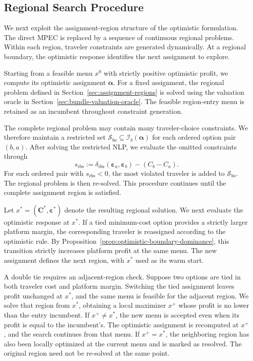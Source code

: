 \documentclass{article}
\begin{document}
\subsection{Regional Search Procedure}
\label{sec:regional-search-procedure}

We next exploit the assignment-region structure of the optimistic
formulation. The direct MPEC is replaced by a sequence of continuous
regional problems. Within each region, traveler constraints are generated
dynamically. At a regional boundary, the optimistic response identifies
the next assignment to explore.

Starting from a feasible menu $x^0$ with strictly positive optimistic
profit, we compute its optimistic assignment $\bm\alpha$. For a fixed
assignment, the regional problem defined in Section~\ref{sec:assignment-regions} is solved using
the valuation oracle in Section~\ref{sec:bundle-valuation-oracle}. The feasible region-entry menu is
retained as an incumbent throughout constraint generation.

The complete regional problem may contain many traveler-choice
constraints. We therefore maintain a restricted set
$\mathcal S_{ba}\subseteq\mathcal I_b(\bm\alpha)$ for each ordered option
pair $(b,a)$. After solving the restricted NLP, we evaluate the omitted
constraints through
\begin{equation}
    s_{iba}
    :=
    \delta_{iba}(\bm\varepsilon_a,\bm\varepsilon_b)
    -
    (C_b-C_a).
    \label{eq:traveler-separation}
\end{equation}
For each ordered pair with $s_{iba}<0$, the most violated traveler is
added to $\mathcal S_{ba}$. The regional problem is then re-solved.
This procedure continues until the complete assignment region is
satisfied.

Let $x^*=(\bm C^*,\bm\varepsilon^*)$ denote the resulting regional
solution. We next evaluate the optimistic response at $x^*$. If a tied
minimum-cost option provides a strictly larger platform margin, the
corresponding traveler is reassigned according to the optimistic rule.
By Proposition~\ref{prop:optimistic-boundary-dominance}, this transition
strictly increases platform profit at the same menu. The new assignment
defines the next region, with $x^*$ used as its warm start.

A double tie requires an adjacent-region check. Suppose two options
are tied in both traveler cost and platform margin. Switching the tied
assignment leaves profit unchanged at $x^*$, and the same menu is feasible
for the adjacent region. We solve that region from $x^*$, obtaining a
local maximizer $x^+$ whose profit is no lower than the entry incumbent.
If $x^+\neq x^*$, the new menu is accepted even when its profit is equal
to the incumbent's. The optimistic assignment is recomputed at $x^+$,
and the search continues from that menu. If $x^+=x^*$, the neighboring
region has also been locally optimized at the current menu and is marked
as resolved. The original region need not be re-solved at the same point.
\end{document}
